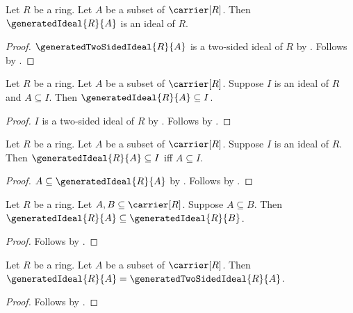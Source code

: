 \begin{theorem}\label{generated_ideal_is_ideal}
    Let $R$ be a ring.
    Let $A$ be a subset of $\carrier[R]$.
    Then $\generatedIdeal{R}{A}$ is an ideal of $R$.
\end{theorem}
\begin{proof}
    $\generatedTwoSidedIdeal{R}{A}$ is a two-sided ideal of $R$ by
        .
    Follows by .
\end{proof}

\begin{theorem}\label{generated_ideal_least}
    Let $R$ be a ring.
    Let $A$ be a subset of $\carrier[R]$.
    Suppose $I$ is an ideal of $R$ and $A\subseteq I$.
    Then $\generatedIdeal{R}{A}\subseteq I$.
\end{theorem}
\begin{proof}
    $I$ is a two-sided ideal of $R$ by .
    Follows by
        .
\end{proof}

\begin{theorem}\label{generated_ideal_universal_property}
    Let $R$ be a ring.
    Let $A$ be a subset of $\carrier[R]$.
    Suppose $I$ is an ideal of $R$.
    Then $\generatedIdeal{R}{A}\subseteq I$ iff $A\subseteq I$.
\end{theorem}
\begin{proof}
    $A\subseteq\generatedIdeal{R}{A}$ by
        .
    Follows by .
\end{proof}

\begin{proposition}\label{generated_ideal_monotone}
    Let $R$ be a ring.
    Let $A,B\subseteq\carrier[R]$.
    Suppose $A\subseteq B$.
    Then $\generatedIdeal{R}{A}\subseteq\generatedIdeal{R}{B}$.
\end{proposition}
\begin{proof}
    Follows by
        .
\end{proof}

\begin{theorem}\label{generated_ideal_eq_generated_two_sided_ideal}
    Let $R$ be a ring.
    Let $A$ be a subset of $\carrier[R]$.
    Then
        $\generatedIdeal{R}{A}=\generatedTwoSidedIdeal{R}{A}$.
\end{theorem}
\begin{proof}
    Follows by .
\end{proof}


